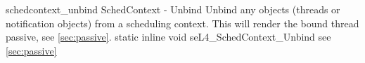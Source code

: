 %
%
%
%

\apidoc
{schedcontext_unbind}
{SchedContext - Unbind}
{Unbind any objects (threads or notification objects) from a scheduling context. 
This will render the bound thread passive, see \autoref{sec:passive}.}
{static inline void seL4\_SchedContext\_Unbind}
{
}
{\errorenumdesc}
{see \autoref{sec:passive}}
